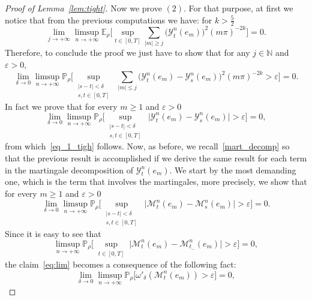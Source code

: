 \documentclass[10pt]{amsart}
\theoremstyle{definition}\newtheorem{defi}[theo]{Definition}\newtheorem{rema}[theo]{Remark}\newtheorem{exam}[theo]{Example}\newtheorem{exem}[theo]{Example}\newtheorem{nota}[theo]{Notation}
\renewcommand{\leq}{\leqslant}
\renewcommand{\geq}{\geqslant}
\renewcommand{\epsilon}{\varepsilon}
\begin{document}
\begin{proof}[Proof of Lemma~\ref{lem:tight}]
Now we prove $(2)$. For that purpose, at first we notice that from the previous computations we have: for $k>\frac52$
\begin{equation*}
\lim_{j\rightarrow{+\infty}}\limsup_{n\rightarrow{+\infty}}\mathbb{E}_{\rho}\bigg[\sup_{t\in[0,T]}\sum_{|m|\geq{j}}
\Big(\mathcal Y^n_{t}(e_m)\Big)^{2}(m\pi)^{-2k}\bigg]=0.
\end{equation*}
Therefore, to conclude the proof we just have to show that for any $j\in{\mathbb{N}}$ and $\epsilon>{0}$,
\begin{equation}\label{eq_1_tigh}
\lim_{\delta\rightarrow{0}}\limsup_{n\rightarrow{+\infty}}\mathbb{P}_{\rho}
\Bigg[\sup_{\substack{|s-t|<\delta\\s,t\in[0,T]}}\;\sum_{|m|\leq{j}}\Big(\mathcal Y^n_{t}(e_m)-{\mathcal Y}^n_{s}(e_{m})\Big)^{2}(m\pi)^{-2k}>\epsilon\Bigg]=0.
\end{equation}
In fact we prove that for every $m\geq 1$ and $\epsilon>0$
\begin{equation*}
\lim_{\delta\rightarrow{0}}\limsup_{n\rightarrow{+\infty}}\mathbb{P}_{\rho}\Bigg[\sup_{\substack{|s-t|<\delta\\s,t\in[0,T]}}\;
\Big|\mathcal Y^n_{t}(e_m)-{\mathcal Y}^n_{s}(e_{m})\Big|>\epsilon\Bigg]=0,
\end{equation*}
from which~\eqref{eq_1_tigh} follows. Now, as before, we recall~\eqref{mart_decomp} so that the previous result is accomplished if we derive the same result for each term in the martingale decomposition of $\mathcal Y_t^n(e_m)$. We start by the most demanding one, which is the term that involves the martingales, more precisely, we show that for every $m\geq 1$ and $\epsilon>0$
\begin{equation}\label{eq:lim}
\lim_{\delta\rightarrow{0}}\limsup_{n\rightarrow{+\infty}}\mathbb{P}_{\rho}\Bigg[\sup_{\substack{|s-t|<\delta\\s,t\in[0,T]}}\;
\big|\mathcal{M}_{t}^{n}(e_m)-\mathcal{M}_{s}^{n}(e_m)\big|>\epsilon\Bigg]=0.
\end{equation}
Since it is easy to see that
\begin{equation*}
\limsup_{n\rightarrow{+\infty}}\mathbb{P}_{\rho}\bigg[\sup_{\substack{t\in[0,T]}}\big|\mathcal{M}_{t}^{n}(e_m)-\mathcal{M}_{t_{-}}^{n}(e_m)\big|>\epsilon\bigg]=0,
\end{equation*}
the claim~\eqref{eq:lim} becomes a consequence of the following fact:
\begin{equation*}
\lim_{\delta\rightarrow{0}}\limsup_{n\rightarrow{+\infty}}\mathbb{P}_{\rho}\Big[\omega'_{\delta}(\mathcal{M}_{t}^{n}(e_m))>\epsilon\Big]=0,

\end{equation*}
\end{proof}
\end{document}
